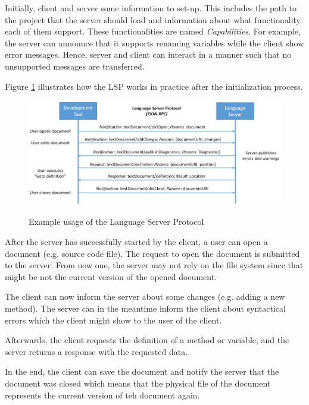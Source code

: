 Initially, client and server some information to set-up. This includes the path to the project that the server should load and information about what functionality each of them support. These functionalities are named \textit{Capabilities}. For example, the server can announce that it supports renaming variables while the client show error messages. Hence, server and client can interact in a manner such that no unsupported messages are transferred.

Figure \ref{fig:lsp_usage} illustrates how the \ac{LSP} works in practice after the initialization process. 
\begin{figure}
    \centering
    \includegraphics{figures/chapter2/language-server-sequence.png}
    \caption{Example usage of the Language Server Protocol}
    \label{fig:lsp_usage}
    \cite{lsp_website}
\end{figure}

After the server has successfully started by the client, a user can open a document (e.g. source code file). The request to open the document is submitted to the server. From now one, the server may not rely on the file system since that might be not the current version of the opened document. 

The client can now inform the server about some changes (e.g. adding a new method). The server can in the meantime inform the client about syntactical errors which the client might show to the user of the client.

Afterwards, the client requests the definition of a method or variable, and the server returns a response with the requested data.

In the end, the client can save the document and notify the server that the document was closed which means that the physical file of the document represents the current version of teh document again. 